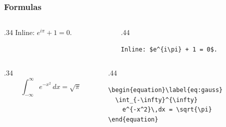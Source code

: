 \documentclass{ltx-talk}
\begin{document}
\begin{frame*}
  \frametitle{Formulas}
  \begin{columns}
    \begin{column}{.34\textwidth}
      Inline: $e^{i\pi} + 1 = 0$.
    \end{column}
    \begin{column}{.44\textwidth}
\small
\begin{verbatim}
Inline: $e^{i\pi} + 1 = 0$.
\end{verbatim}
    \end{column}
  \end{columns}

  \begin{columns}
    \begin{column}{.34\textwidth}
      \begin{equation}\label{eq:gauss}
        \int_{-\infty}^{\infty} e^{-x^2}\,dx = \sqrt{\pi}
      \end{equation}
    \end{column}
    \begin{column}{.44\textwidth}
\small
\begin{verbatim}
\begin{equation}\label{eq:gauss}
  \int_{-\infty}^{\infty}
    e^{-x^2}\,dx = \sqrt{\pi}
\end{equation}
\end{verbatim}
    \end{column}
  \end{columns}
\end{frame*}
\end{document}

